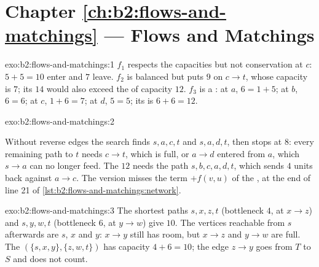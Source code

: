 \section*{Chapter \ref{ch:b2:flows-and-matchings} --- Flows and Matchings}

\begin{solution}{exo:b2:flows-and-matchings:1}
$f_1$ respects the capacities but not conservation at $c$: $5 + 5 = 10$ enter and $7$ leave. $f_2$ is balanced but puts
$9$ on $c \to t$, whose capacity is $7$; its  $14$ would also exceed the  of capacity $12$. $f_3$ is a : at
$a$, $6 = 1 + 5$; at $b$, $6 = 6$; at $c$, $1 + 6 = 7$; at $d$, $5 = 5$; its  is $6 + 6 = 12$.

\end{solution}

\begin{solution}{exo:b2:flows-and-matchings:2}

Without reverse edges the search finds $s, a, c, t$ and $s, a, d, t$, then stops at $8$: every remaining path to $t$
needs $c \to t$, which is full, or $a \to d$ entered from $a$, which $s \to a$ can no longer feed. The  $12$ needs
the path $s, b, c, a, d, t$, which sends $4$ units back against $a \to c$. The version misses the term $+ f(v, u)$ of
the , at the end of line 21 of \cref{lst:b2:flows-and-matchings:network}.
\end{solution}

\begin{solution}{exo:b2:flows-and-matchings:3}
The shortest paths $s, x, z, t$ (bottleneck $4$, at $x \to z$) and $s, y, w, t$ (bottleneck $6$, at $y \to w$) give
$10$. The vertices reachable from $s$ afterwards are $s$, $x$ and $y$: $x \to y$ still has room, but $x \to z$ and $y \to
w$ are full. The  $(\{s, x, y\}, \{z, w, t\})$ has capacity $4 + 6 = 10$; the edge $z \to y$ goes from $T$ to $S$ and
does not count.

\end{solution}

